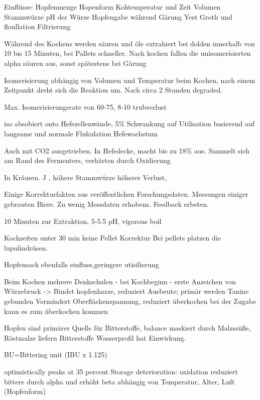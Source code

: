 \documentclass[a4paper,parskip=half]{scrartcl}
\begin{document}
Einflüsse:
Hopfenmenge
Hopenform
Kohtemperatur und Zeit
Volumen
Stammwürze
pH der Würze
Hopfengabe während Gärung
Yest Groth und floullation
Filtrierung

\parencite[125]{Garetz1994} 
Während des Kochens werden säuren und öle extrahiert 
bei dolden innerhalb von 10 bis 15 Minuten, bei Pallets
schneller.
Nach kochen fallen die unisomerisierten alpha säuren
aus, sonst spätestens bei Gärung

Isomerisierung abhängig von Volumen und Temperatur beim
Kochen, nach einem Zeitpunkt dreht sich die Reaktion
um. Nach circa 2 Stunden degraded. 

\parencite[126]{Garetz1994} 
Max. Isomerisierungsrate von 60-75, 8-10 trubverlust

iso absobiert onto Hefezellenwände, 5\% Schwankung auf
Utilisation basierend auf langsame und normale Flukulation
Hefewachstum

Auch mit CO2 ausgetrieben. In Hefedecke, macht bis zu 18\%
aus. Sammelt sich am Rand des Fermenters, verhärten durch
Oxidierung

\parencite[133]{Garetz1994} 
In Kräusen. J , höhere Stammwürze höherer Verlust, 

\parencite[128]{Garetz1994} 
Einige Korrekturfakten aus veröffentlichen Forschungsdaten. 
Messungen einiger gebrauten Biere.
Zu wenig Messdaten erhobens. Feedback erbeten.

10 Minuten zur Extraktion, 5-5.5 pH, vigorous boil

\parencite[130]{Garetz1994} 
Kochzeiten unter 30 min keine Pellet Korrektur
Bei pellets platzen die lupulindrüsen. 

Hopfensack ebenfalls einfluss,geringere utisilierung

\parencite[153]{Garetz1994} 
Beim Kochen mehrere Denkschulen
- bei Kochbeginn
- erste Anzeichen von Würzebruck
-> Bindet hopfenharze, reduziert Ausbeute; primär werden
Tanine gebunden
Vermindert Oberflächenspannung, reduziert überkochen
bei der Zugabe kann es zum überkochen kommen

\parencite[158\psq]{Garetz1994} 
Hopfen sind primärer Quelle für Bitterstoffe, balance
maskiert durch Malzssüße, 
Röstmalze liefern Bitterstoffe
Wasserprofil hat Einwirkung.

BU=Bittering unit (IBU x 1.125)
\parencite[215]{Noonan1996}


\parencite[57]{Hall1997}
optimistically peaks at 35 percent
Storage deterioration: oxidation reduziert bittere durch alpha und erhöht beta
abhängig von Temperatur, Alter, Luft (Hopfenform)
\end{document}
